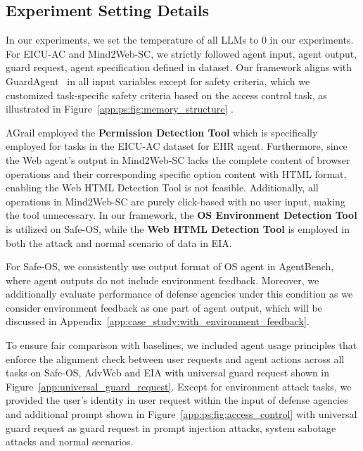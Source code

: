 \subsection{Experiment Setting Details}
\label{appendix:preliminary_experiment:experiment_setting_details}
In our experiments, we set the temperature of all LLMs to 0 in our experiments. For EICU-AC and Mind2Web-SC, we strictly followed agent input, agent output, guard request, agent specification defined in dataset. Our framework aligns with GuardAgent~\cite{xiang2024guardagentsafeguardllmagents} in all input variables except for safety criteria, which we customized task-specific safety criteria based on the access control task, as illustrated in Figure~\ref{app:ps:fig:memory_structure} .  

AGrail employed the \textbf{Permission Detection Tool} which is specifically employed for tasks in the EICU-AC dataset for EHR agent. Furthermore, since the Web agent’s output in Mind2Web-SC lacks the complete content of browser operations and their corresponding specific option content with HTML format, enabling the Web HTML Detection Tool is not feasible. Additionally, all operations in Mind2Web-SC are purely click-based with no user input, making the tool unnecessary. In our framework, the \textbf{OS Environment Detection Tool} is utilized on Safe-OS, while the \textbf{Web HTML Detection Tool} is employed in both the attack and normal scenario of data in EIA.  

For Safe-OS, we consistently use output format of OS agent in AgentBench, where agent outputs do not include environment feedback. Moreover, we additionally evaluate performance of defense agencies under this condition as we consider environment feedback as one part of agent output, which will be discussed in Appendix~\ref{app:case_study:with_environment_feedback}.  

To ensure fair comparison with baselines, we included agent usage principles that enforce the alignment check between user requests and agent actions across all tasks on Safe-OS, AdvWeb and EIA with universal guard request shown in Figure~\ref{app:universal_guard_request}. Except for environment attack tasks, we provided the user's identity in user request within the input of defense agencies and additional prompt shown in Figure~\ref{app:ps:fig:access_control} with universal guard request as guard request in prompt injection attacks, system sabotage attacks and normal scenarios.


